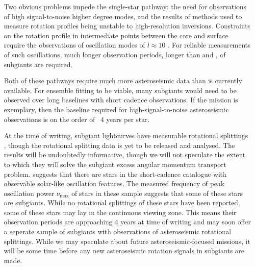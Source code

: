 Two obvious problems impede the single-star pathway: the need for observations of high signal-to-noise higher degree modes, and the results of methods used to measure rotation profiles being unstable to high-resolution inversions. 
Constraints on the rotation profile in intermediate points between the core and surface require the observations of oscillation modes of $l \approx 10$ \citep{ahlborn_asteroseismic_2020}. 
For reliable measurements of such oscillations, much longer observation periods, longer than \corot{} and \kepler{}, of subgiants are required.
   
Both of these pathways require much more asteroseismic data than is currently available.
For ensemble fitting to be viable, many subgiants would need to be observed over long baselines with short cadence observations.
If the \kepler{} mission is exemplary, then the baseline required for high-signal-to-noise asteroseismic observations is on the order of ~4 years per star.

At the time of writing,  subgiant lightcurves have measurable rotational splittings \citep{li_asteroseismology_2020,li_asteroseismology_2020-1}, though the rotational splitting data is yet to be released and analysed.
The results will be undoubtedly informative, though we will not speculate the extent to which they will solve the subgiant excess angular momentum transport problem.
\citet{hatt_catalogue_2023} suggests that there are  stars in the \tess{} short-cadence catalogue with observable solar-like oscillation features.
The measured frequency of peak oscillation power $\nu_{\text{max}}$ of stars in these sample suggests that some of these stars are subgiants.
While no rotational splittings of these stars have been reported, some of these stars may lay in the continuous viewing zone.
This means their observation periods are approaching 4 years at time of writing and may soon offer a seperate sample of subgiants with observations of asteroseismic rotational splittings.
While we may speculate about future asteroseismic-focused missions, it will be some time before any new asteroseismic rotation signals in subgiants are made.

